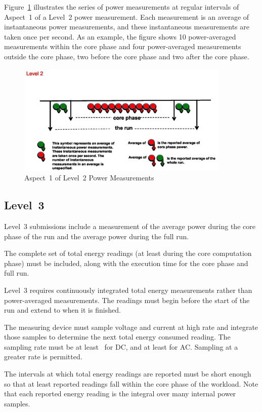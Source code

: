 \noindent
Figure~\ref{fig:a1l2pm} illustrates the series of power measurements at regular intervals of Aspect~1 of a Level~2 power measurement.
Each measurement is an average of instantaneous power measurements, and these instantaneous measurements are taken once per second.
As an example, the figure shows 10 power-averaged measurements within the core phase and four power-averaged measurements outside the core phase, two before the core phase and two after the core phase.

\begin{figure}
\centering
\includegraphics[width=4in]{fig3-4}
\caption{Aspect~1 of Level~2 Power Measurements}
\label{fig:a1l2pm}
\end{figure}

\subsection{Level~3}
\noindent
Level~3 submissions include a measurement of the average power during the core phase of the run and the average power during the full run.
\wl

\noindent
The complete set of total energy readings (at least \MinMeasurementsCorePhaseLTwoThree{} during the core computation phase) must be included, along with the execution time for the core phase and full run.
\wl

\noindent
Level~3 requires continuously integrated total energy measurements rather than power-averaged measurements.
The readings must begin before the start of the run and extend to when it is finished.
\wl

\noindent
The measuring device must sample voltage and current at high rate and integrate those samples to determine the next total energy consumed reading.
The sampling rate must be at least~\SpecRateLThreeDC{} for DC, and at least \SpecRateLThreeAC{} for AC.
Sampling at a greater rate is permitted.
\wl

\noindent
The intervals at which total energy readings are reported must be short enough so that at least \MinMeasurementsCorePhaseLTwoThree{} reported readings fall within the core phase of the workload.
Note that each reported energy reading is the integral over many internal power samples.
\wl

